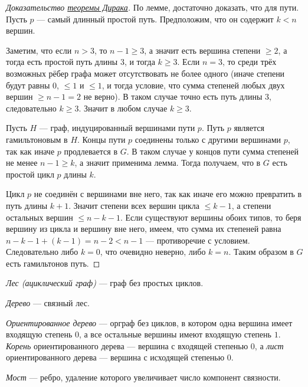 \documentclass[12pt,a4paper]{article}
\begin{document}
    \begin{proof}[Доказательство {\hyperref[Dirac's-theorem]{теоремы Дирака}}]
        По лемме, достаточно доказать, что для пути. Пусть $p$ --- самый длинный простой путь. Предположим, что он содержит $k < n$ вершин.

        Заметим, что если $n > 3$, то $n - 1 \geqslant 3$, а значит есть вершина степени $\geqslant 2$, а тогда есть простой путь длины $3$, и тогда $k \geqslant 3$. Если $n = 3$, то среди трёх возможных рёбер графа может отсутствовать не более одного (иначе степени будут равны $0$, $\leqslant 1$ и $\leqslant 1$, и тогда условие, что сумма степеней любых двух вершин $\geqslant n - 1 = 2$ не верно). В таком случае точно есть путь длины $3$, следовательно $k \geqslant 3$. Значит в любом случае $k \geqslant 3$.

        Пусть $H$ --- граф, индуцированный вершинами пути $p$. Путь $p$ является гамильтоновым в $H$. Концы пути $p$ соединены только с другими вершинами $p$, так как иначе $p$ продлевается в $G$. В таком случае у концов пути сумма степеней не менее $n - 1 \geqslant k$, а значит применима лемма. Тогда получаем, что в $G$ есть простой цикл $p$ длины $k$.
        
        Цикл $p$ не соединён с вершинами вне него, так как иначе его можно превратить в путь длины $k + 1$. Значит степени всех вершин цикла $\leqslant k - 1$, а степени остальных вершин $\leqslant n - k - 1$. Если существуют вершины обоих типов, то беря вершину из цикла и вершину вне него, имеем, что сумма их степеней равна $n - k - 1 + (k - 1)= n - 2 < n - 1$ --- противоречие с условием. Следовательно либо $k = 0$, что очевидно неверно, либо $k = n$. Таким образом в $G$ есть гамильтонов путь.
    \end{proof}

    \begin{definition}
        \emph{Лес (ациклический граф)} --- граф без простых циклов.

        \emph{Дерево} --- связный лес.

        \emph{Ориентированное дерево} --- орграф без циклов, в котором одна вершина имеет входящую степень $0$, а все остальные вершины имеют входящую степень $1$. \emph{Корень} ориентированного дерева --- вершина с входящей степенью $0$, а \emph{лист} ориентированного дерева --- вершина с исходящей степенью $0$.
    \end{definition}

    \begin{definition}
        \emph{Мост} --- ребро, удаление которого увеличивает число компонент связности.
    \end{definition}
\end{document}
